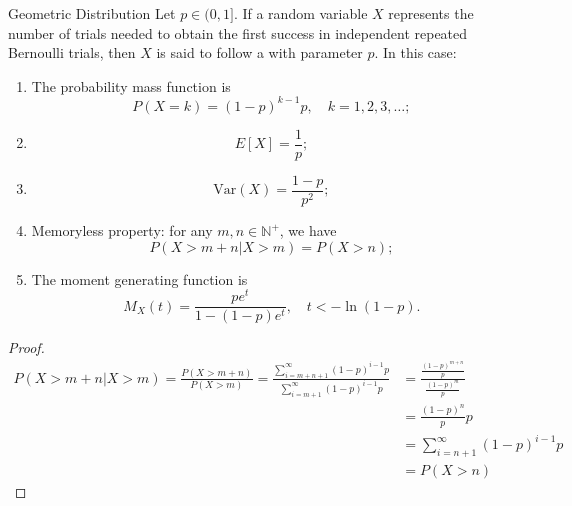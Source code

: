 \documentclass[../main.tex]{subfiles}
\begin{document}
\begin{proposition}{Geometric Distribution}{}
Let $p \in (0,1]$. If a random variable $X$ represents the number of trials needed to obtain the first success in independent repeated Bernoulli trials, then $X$ is said to follow a  with parameter $p$. In this case:

\begin{enumerate}
\item The probability mass function is 
\[P(X=k) = (1-p)^{k-1}p, \quad k=1,2,3,\ldots;\]

\item \[E[X] = \frac{1}{p};\]

\item \[\text{Var}(X) = \frac{1-p}{p^2};\]

\item Memoryless property: for any $m,n \in \mathbb{N}^+$, we have 
\[P(X>m+n|X>m) = P(X>n);\]

\item The moment generating function is 
\[M_X(t) = \frac{pe^t}{1-(1-p)e^t}, \quad t < -\ln(1-p).\]
\end{enumerate}
\end{proposition}
\begin{proof}
     \[
     \begin{aligned}
     P\left( X> m+ n|X> m \right) = \frac{P\left( X> m+ n \right)  }{P\left( X> m \right)  }= \frac{\sum _{i= m+ n+ 1}^{\infty}\left( 1-p \right)^{i-1}p  }{ \sum _{i= m+ 1}^{\infty}\left( 1-p \right)^{i-1}p }  &= \frac{\frac{\left( 1-p \right)^{m+ n}  }{p }  }{\frac{\left( 1-p \right)^{m}  }{ p}  }  \\ 
      &= \frac{\left( 1-p \right)^{n}  }{p }p\\ 
       &=  \sum _{i= n+ 1}^{\infty}\left( 1-p \right)^{i-1}p\\ 
        &= P\left( X> n \right)  
     \end{aligned}
     \]
\end{proof}
\end{document}
